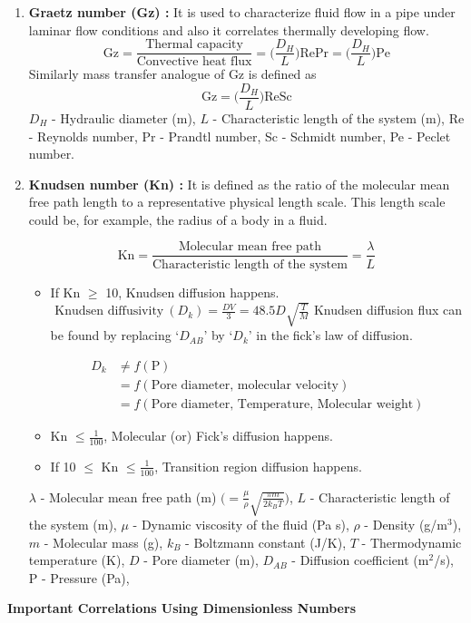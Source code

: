 \documentclass[a4paper, 12 pt]{article}
\begin{document}
\begin{enumerate}
    \item \textbf{Graetz number (Gz) :} It is used to characterize fluid flow in a pipe under laminar flow conditions and also it correlates thermally developing flow.
    $$\text{Gz}=\frac{\text{Thermal capacity}}{\text{Convective heat flux}}=\bigg( \frac{D_H}{L} \bigg) \text{RePr} = \bigg( \frac{D_H}{L} \bigg) \text{Pe}$$
    Similarly mass transfer analogue of Gz is defined as
    $$\text{Gz}=\bigg( \frac{D_H}{L} \bigg) \text{ReSc}$$
    $D_H$ - Hydraulic diameter (m), $L$ - Characteristic length of the system (m), Re - Reynolds  number, Pr - Prandtl number, Sc - Schmidt number, Pe - Peclet number.
    
    \item \textbf{Knudsen number (Kn) :} It is defined as the ratio of the molecular mean free path length to a representative physical length scale. This length scale could be, for example, the radius of a body in a fluid.
    
    $$\text{Kn}=\frac{\text{Molecular mean free path}}{\text{Characteristic length of the system}}=\frac{\lambda}{L}$$
    
    \begin{itemize}
        \item If Kn $\geq$ 10, Knudsen diffusion happens.$\text{ Knudsen diffusivity}\  (D_k)=\frac{DV}{3}=48.5D\sqrt{\frac{T}{M}}$
        Knudsen diffusion flux can be found by replacing `$D_{AB}$' by `$D_k$' in the fick's law of diffusion. \vspace{-8 mm}
        
        \begin{align*}
            D_k&\neq f(\text{P})\\&=f(\text{Pore diameter, molecular velocity})\\&=f(\text{Pore diameter, Temperature, Molecular weight})
        \end{align*}
        
        \item Kn $\leq \frac{1}{100}$, Molecular (or) Fick's diffusion happens. 
        
        \item If 10 $\leq$ Kn $\leq \frac{1}{100}$, Transition region diffusion happens.
    \end{itemize}
    $\lambda$ - Molecular mean free path (m) $\bigg(=\frac{\mu}{\rho}\sqrt{\frac{\pi m}{2k_BT}}\bigg) $, $L$ - Characteristic length of the system (m), $\mu$ - Dynamic viscosity of the fluid (Pa s), $\rho$ - Density (g/m$^3$), $m$ - Molecular mass (g), $k_B$ - Boltzmann constant (J/K), $T$ - Thermodynamic temperature (K), $D$ - Pore diameter (m), $D_{AB}$ - Diffusion coefficient (m$^2$/s), P - Pressure (Pa), 
\end{enumerate}
\begin{center}
    \large \textbf{Important Correlations Using Dimensionless Numbers}    
\end{center}
\end{document}
